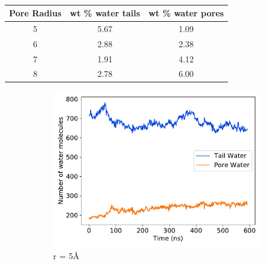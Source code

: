 \documentclass{article}
\begin{document}
  \begin{table}
  \centering
  \begin{tabular}{|c|c|c|}
  \hline
  Pore Radius & wt \% water tails & wt \% water pores \\
  \hline
  5           &        5.67       &     1.09          \\
  6           &        2.88       &     2.38          \\
  7           &        1.91       &     4.12          \\
  8           &        2.78       &     6.00          \\
  \hline
  \end{tabular}
  \caption{}\label{table:water_content}
  \end{table}

  \begin{figure}
  \centering
  \begin{subfigure}{0.45\textwidth}
  \includegraphics[width=\linewidth]{r5_gap.pdf}
  \caption{r = 5\AA}\label{fig:r5_gap}
  \end{subfigure}
  \begin{subfigure}{0.45\textwidth}

\end{subfigure}
\end{figure}
\end{document}
